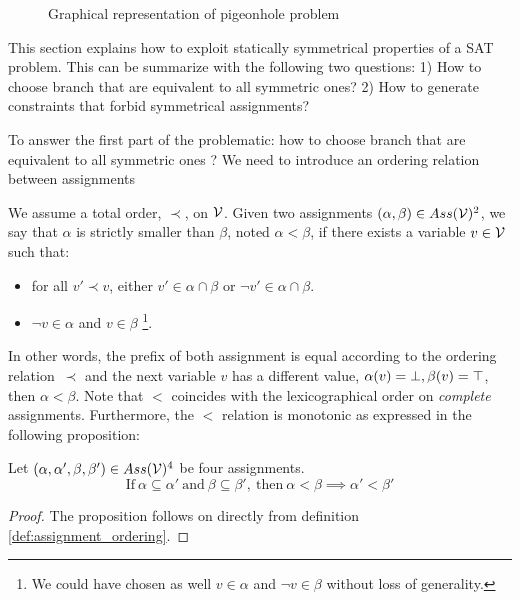 \begin{figure}
	\centering
	\caption{Graphical representation of pigeonhole problem}
	\label{fig:hole}
\end{figure}


This section explains how to exploit statically symmetrical properties of a SAT problem. This can be summarize with the following two 
questions: 1) How  to choose branch that are equivalent to all symmetric ones?
 2) How to generate constraints that forbid symmetrical assignments?




To answer the first part of the problematic: how to choose branch that are equivalent to all symmetric ones ?
We need to introduce an ordering relation between assignments

\begin{definition}
 \label{def:assignment_ordering}
 We assume a total order, $\prec$, on $\mathcal{V}$.  Given two assignments $(\alpha,\beta) \in Ass(\mathcal{V})^2 $, 
 we say that $\alpha$ is strictly smaller than $\beta$, noted $\alpha < \beta$, if there exists a variable $v \in \mathcal{V}$
 such that:
 \begin{itemize}
  \item for all $v' \prec v$, either $v' \in \alpha \cap \beta$ or $\neg v' \in \alpha \cap
  \beta$.
  \item $\neg v \in \alpha$ and $v \in \beta$ \footnote{We could have chosen as well 
   $v \in \alpha$ and $\neg v \in \beta$ without loss of generality.}.
 \end{itemize}
\end{definition}

In other words, the prefix of both assignment is equal according to the ordering relation~$\prec$
and the next variable $v$ has a different value, $\alpha(v) = \bot, \beta(v) = \top$, then $\alpha < \beta$.
Note that $<$ coincides with the lexicographical order on \emph{complete}
assignments. 
Furthermore, the $<$ relation is monotonic as expressed in the following proposition:
\begin{proposition}
 \label{prop:monocity_assignments_ordering}
 Let  $(\alpha,\alpha',\beta,\beta') \in Ass(\mathcal{V})^4 $ be four assignments.
 $$\text{If}~\alpha \subseteq \alpha'~\text{and}~\beta \subseteq \beta',~\text{then}~\alpha < \beta \implies \alpha' < \beta'$$
\end{proposition}
\begin{proof}
 The proposition follows on directly from definition \ref{def:assignment_ordering}.
\end{proof}

